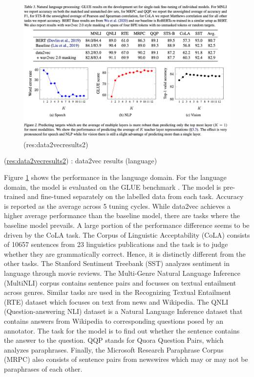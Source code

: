 \documentclass[
]{krantz}
\begin{document}
\begin{figure}

{\centering \includegraphics[width=1\linewidth]{figures/05-chapter2/datavecresultstwo} 

}

\caption{(res:data2vecresults2)}\label{fig:data2vecresults2}
\end{figure}

(\url{res:data2vecresults2}) \citet{baevski2022data2vec}: data2vec results (language)

Figure \ref{fig:data2vecresults2} shows the performance in the language domain. For the language domain, the model is evaluated on the GLUE benchmark \citep{wang2018glue}. The model is pre-trained and fine-tuned separately on the labelled data from each task. Accuracy is reported as the average across 5 tuning cycles. While data2vec achieves a higher average performance than the baseline model, there are tasks where the baseline model prevails. A large portion of the performance difference seems to be driven by the CoLA task. The Corpus of Linguistic Acceptability (CoLA) consists of 10657 sentences from 23 linguistics publications and the task is to judge whether they are grammatically correct. Hence, it is distinctly different from the other tasks. The Stanford Sentiment Treebank (SST) analyzes sentiment in language through movie reviews. The Multi-Genre Natural Language Inference (MultiNLI) corpus contains sentence pairs and focusses on textual entailment across genres. Similar tasks are used in the Recognizing Textual Entailment (RTE) dataset which focuses on text from news and Wikipedia. The QNLI (Question-answering NLI) dataset is a Natural Language Inference dataset that contains answers from Wikipedia to corresponding questions posed by an annotator. The task for the model is to find out whether the sentence contains the answer to the question. QQP stands for Quora Question Pairs, which analyzes paraphrases. Finally, the Microsoft Research Paraphrase Corpus (MRPC) also consists of sentence pairs from newswires which may or may not be paraphrases of each other.
\end{document}
